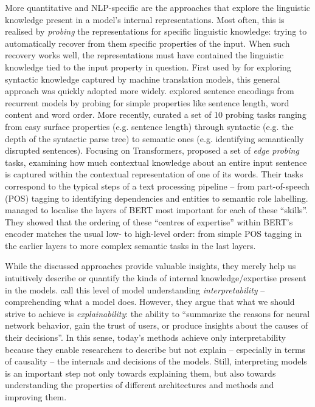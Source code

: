 \documentclass[bsc,frontabs,twoside,singlespacing,parskip,deptreport]{infthesis}
\begin{document}
{{    More quantitative and NLP-specific are the approaches that explore the linguistic knowledge present in a model's internal representations.
    Most often, this is realised by \textit{probing} the representations for specific linguistic knowledge: trying to automatically recover from them specific properties of the input. When such recovery works well, the representations must have contained the linguistic knowledge tied to the input property in question.
    First used by \citet{Shi_2016} for exploring syntactic knowledge captured by machine translation models, this general approach was quickly adopted more widely.
    \citet{Adi_2017} explored sentence encodings from recurrent models by probing for simple properties like sentence length, word content and word order.
    More recently, \citet{Conneau_2018} curated a set of 10 probing tasks ranging from easy surface properties (e.g. sentence length) through syntactic (e.g. the depth of the syntactic parse tree) to semantic ones (e.g. identifying semantically disrupted sentences).
    Focusing on Transformers, \citet{Tenney_2019a} proposed a set of \textit{edge probing} tasks, examining how much contextual knowledge about an entire input sentence is captured within the contextual representation of one of its words.
    Their tasks correspond to the typical steps of a text processing pipeline -- from part-of-speech (POS) tagging to identifying dependencies and entities to semantic role labelling. 
    \citet{Tenney_2019b} managed to localise the layers of BERT most important for each of these ``skills''. They showed that the ordering of these ``centres of expertise'' within BERT's encoder matches the usual low- to high-level order: from simple POS tagging in the earlier layers to more complex semantic tasks in the last layers.

    While the discussed approaches provide valuable insights, they merely help us intuitively describe or quantify the kinds of internal knowledge/expertise present in the models. 
    \citet{Gilpin_2018} call this level of model understanding \textit{interpretability} -- comprehending what a model does. 
    However, they argue that what we should strive to achieve is \textit{explainability}: the ability to ``summarize the reasons for neural network behavior, gain the trust of users, or produce insights about the causes of their decisions''.
    In this sense, today's methods achieve only interpretability because they enable researchers to describe but not explain -- especially in terms of causality -- the internals and decisions of the models.
    Still, interpreting models is an important step not only towards explaining them, but also towards understanding the properties of different architectures and methods and improving them.
    
}}
\end{document}
